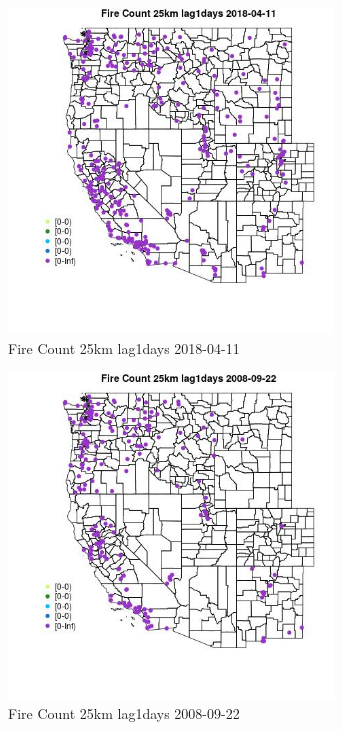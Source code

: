 \begin{figure} 
\centering  
\includegraphics[width=0.77\textwidth]{Code_Outputs/Report_ML_input_PM25_Step4_part_e_de_duplicated_aves_compiled_2019-05-18wNAs_MapObsFire_Count_25km_lag1days2018-04-11.jpg} 
\caption{\label{fig:Report_ML_input_PM25_Step4_part_e_de_duplicated_aves_compiled_2019-05-18wNAsMapObsFire_Count_25km_lag1days2018-04-11}Fire Count 25km lag1days 2018-04-11} 
\end{figure} 
 

\begin{figure} 
\centering  
\includegraphics[width=0.77\textwidth]{Code_Outputs/Report_ML_input_PM25_Step4_part_e_de_duplicated_aves_compiled_2019-05-18wNAs_MapObsFire_Count_25km_lag1days2008-09-22.jpg} 
\caption{\label{fig:Report_ML_input_PM25_Step4_part_e_de_duplicated_aves_compiled_2019-05-18wNAsMapObsFire_Count_25km_lag1days2008-09-22}Fire Count 25km lag1days 2008-09-22} 
\end{figure} 
 

